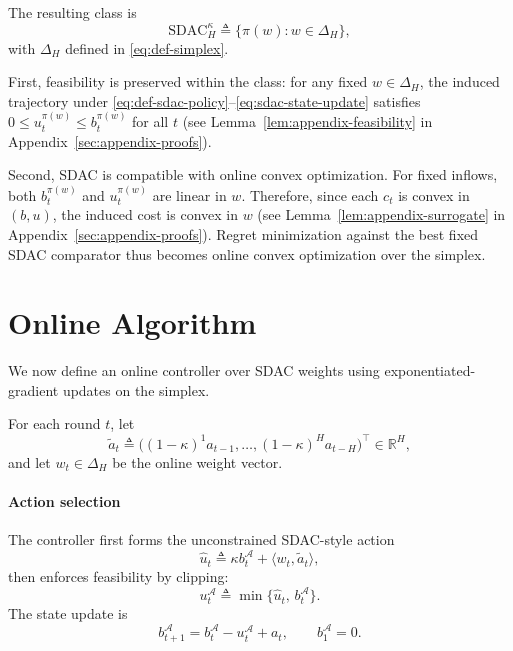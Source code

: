 \documentclass[11pt]{article}
\begin{document}
The resulting class is
\[
\mathrm{SDAC}_H^{\kappa}\triangleq\{\pi(w):w\in\Delta_H\},
\]
with $\Delta_H$ defined in \eqref{eq:def-simplex}.

First, feasibility is preserved within the class: for any fixed $w\in\Delta_H$, the induced trajectory under \eqref{eq:def-sdac-policy}--\eqref{eq:sdac-state-update} satisfies $0\le u_t^{\pi(w)}\le b_t^{\pi(w)}$ for all $t$ (see Lemma~\ref{lem:appendix-feasibility} in Appendix~\ref{sec:appendix-proofs}).

Second, SDAC is compatible with online convex optimization. For fixed inflows, both $b_t^{\pi(w)}$ and $u_t^{\pi(w)}$ are linear in $w$. Therefore, since each $c_t$ is convex in $(b,u)$, the induced cost is convex in $w$ (see Lemma~\ref{lem:appendix-surrogate} in Appendix~\ref{sec:appendix-proofs}). Regret minimization against the best fixed SDAC comparator thus becomes online convex optimization over the simplex.





\section{Online Algorithm}
\label{sec:online-algorithm}

We now define an online controller over SDAC weights using exponentiated-gradient updates on the simplex.

For each round $t$, let
\[
\widetilde{a}_t \triangleq \big((1-\kappa)^1 a_{t-1},\ldots,(1-\kappa)^H a_{t-H}\big)^\top \in \mathbb{R}^H,
\]
and let $w_t\in\Delta_H$ be the online weight vector.

\paragraph{Action selection}
The controller first forms the unconstrained SDAC-style action
\begin{equation}
\label{eq:alg-unconstrained-action}
\widehat{u}_t \triangleq \kappa b_t^{\mathcal A} + \langle w_t,\widetilde{a}_t\rangle,
\end{equation}
then enforces feasibility by clipping:
\begin{equation}
\label{eq:alg-feasible-action}
u_t^{\mathcal A} \triangleq \min\{\widehat{u}_t,\,b_t^{\mathcal A}\}.
\end{equation}
The state update is
\begin{equation}
\label{eq:alg-state-update}
b_{t+1}^{\mathcal A} = b_t^{\mathcal A} - u_t^{\mathcal A} + a_t,
\qquad b_1^{\mathcal A}=0.
\end{equation}
\end{document}
